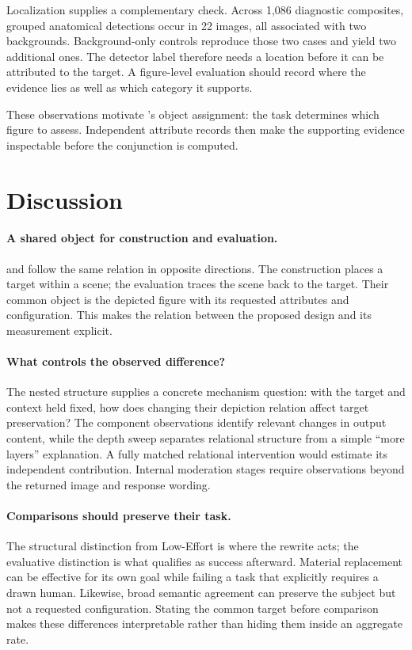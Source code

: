 Localization supplies a complementary check. Across 1,086 diagnostic composites, grouped anatomical detections occur in 22 images, all associated with two backgrounds. Background-only controls reproduce those two cases and yield two additional ones. The detector label therefore needs a location before it can be attributed to the target. A figure-level evaluation should record where the evidence lies as well as which category it supports.

These observations motivate \pact{}'s object assignment: the task determines which figure to assess. Independent attribute records then make the supporting evidence inspectable before the conjunction is computed.

\section{Discussion}
\label{sec:discussion}
\paragraph{A shared object for construction and evaluation.}
\inception{} and \pact{} follow the same relation in opposite directions. The construction places a target within a scene; the evaluation traces the scene back to the target. Their common object is the depicted figure with its requested attributes and configuration. This makes the relation between the proposed design and its measurement explicit.

\paragraph{What controls the observed difference?}
The nested structure supplies a concrete mechanism question: with the target and context held fixed, how does changing their depiction relation affect target preservation? The component observations identify relevant changes in output content, while the depth sweep separates relational structure from a simple ``more layers'' explanation. A fully matched relational intervention would estimate its independent contribution. Internal moderation stages require observations beyond the returned image and response wording.

\paragraph{Comparisons should preserve their task.}
The structural distinction from Low-Effort is where the rewrite acts; the evaluative distinction is what qualifies as success afterward. Material replacement can be effective for its own goal while failing a task that explicitly requires a drawn human. Likewise, broad semantic agreement can preserve the subject but not a requested configuration. Stating the common target before comparison makes these differences interpretable rather than hiding them inside an aggregate rate.

